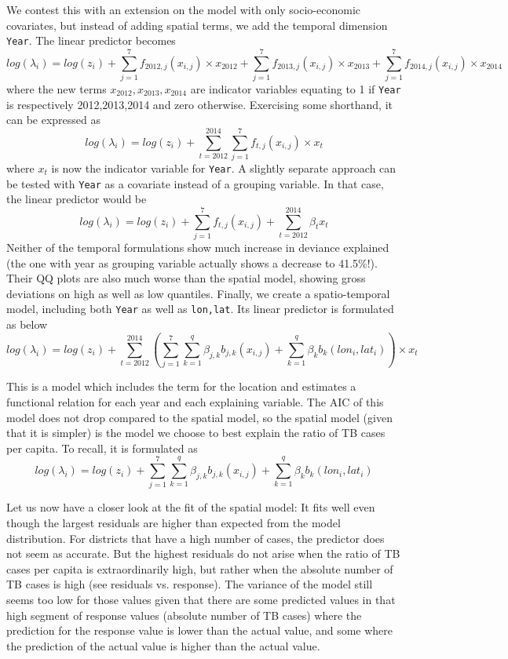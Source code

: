 \documentclass{article}
\begin{document}
We contest this with an extension on the model with only socio-economic covariates, but instead of adding spatial terms, we add the temporal dimension \texttt{Year}. The linear predictor becomes
$$
log(\lambda_i) = log(z_i) +  \sum_{j=1}^{7}f_{2012, j}(x_{i,j})\times x_{2012}  + \sum_{j=1}^{7}f_{2013, j}(x_{i,j})\times x_{2013} +  \sum_{j=1}^{7}f_{2014, j}(x_{i,j})\times x_{2014}
$$
where the new terms $x_{2012},x_{2013},x_{2014}$ are indicator variables equating to 1 if \texttt{Year} is respectively 2012,2013,2014 and zero otherwise. Exercising some shorthand, it can be expressed as
$$
log(\lambda_i) = log(z_i) +  \sum_{t=2012}^{2014}\sum_{j=1}^{7}f_{t, j}(x_{i,j})\times x_{t}
$$
where $x_t$ is now the indicator variable for \texttt{Year}. A slightly separate approach can be tested with \texttt{Year} as a covariate instead of a grouping variable. In that case, the linear predictor would be
$$
log(\lambda_i) = log(z_i) +  \sum_{j=1}^{7}f_{t, j}(x_{i,j}) + \sum_{t=2012}^{2014}\beta_t x_t
$$
Neither of the temporal formulations show much increase in deviance explained (the one with year as grouping variable actually shows a decrease to 41.5\%!). Their QQ plots are also much worse than the spatial model, showing gross deviations on high as well as low quantiles. Finally, we create a spatio-temporal model, including both \texttt{Year} as well as \texttt{lon,lat}. Its linear predictor is formulated as below
$$
log(\lambda_i) = log(z_i) +  \sum_{t=2012}^{2014}\left( \sum_{j=1}^{7}\sum_{k=1}^{q}\beta_{j,k}b_{j,k}(x_{i,j}) + \sum_{k=1}^{q}\beta_{k}b_{k}(lon_i , lat_i) \right) \times x_{t}
$$
\newline

This is a model which includes the term for the location and estimates a functional relation for
each year and each explaining variable. The AIC of this model does not drop compared to the spatial model,
so the spatial model (given that it is simpler) is the model we choose to best explain the ratio of TB cases per capita. To recall, it is formulated as 
$$
log(\lambda_i) = log(z_i) +  \sum_{j=1}^{7}\sum_{k=1}^{q}\beta_{j,k}b_{j,k}(x_{i,j}) + \sum_{k=1}^{q}\beta_{k}b_{k}(lon_i , lat_i) 
$$
\newline

Let us now have a closer look at the fit of the spatial model: It fits well even though the largest residuals are higher
than expected from the model distribution. For districts that have a high number of cases, the predictor does
not seem as accurate. But the highest residuals do not arise when the ratio of TB cases per capita
is extraordinarily high, but rather when the absolute number of TB cases is high (see residuals vs. response).
The variance of the model still seems too low for those values given that there are some predicted values in
that high segment of response values (absolute number of TB cases) where the prediction for the response
value is lower than the actual value, and some where the prediction of the actual value is higher than the
actual value.
\newline
\end{document}
